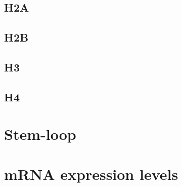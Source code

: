 \documentclass[10pt,a4paper,draft]{article}
\begin{document}
    \subsection{H2A}
    \subsection{H2B}
    \subsection{H3}
    \subsection{H4}

  \section{Stem-loop}

  \section{mRNA expression levels}
\end{document}
